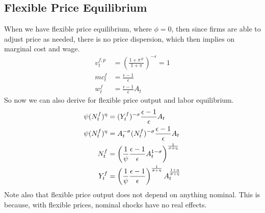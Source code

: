 \documentclass[twocolumn, fleqn]{article}
\begin{document}
	\subsection{Flexible Price Equilibrium}
	When we have flexible price equilibrium, where $\phi=0$, then since firms are able to adjust price as needed, there is no price dispersion, which then implies on marginal cost and wage.
	\begin{align*}
		 v_t^{f,p} &= \left( \frac{1 + \pi^{\#}}{1 + \pi} \right)^{-\epsilon} = 1\\
		 mc_t^f &= \frac{\epsilon-1}{\epsilon}\\
		 w_t^f &= \frac{\epsilon-1}{\epsilon	}A_t
	\end{align*}
	So now we can also derive for flexible price output and labor equilibrium.
	\begin{align}
    \psi (N_t^f)^{\eta} &= (Y_t^f)^{-\sigma} \frac{\epsilon-1}{\epsilon} A_t \notag\\
    \psi (N_t^f)^{\eta} &= A_t^{-\sigma} (N_t^f)^{-\sigma} \frac{\epsilon-1}{\epsilon} A_t \notag\\
    N_t^f &= \left( \frac{1}{\psi} \frac{\epsilon-1}{\epsilon} A_t^{1-\sigma} \right)^{\frac{1}{\sigma + \eta}} \notag\\
    Y_t^f &= \left( \frac{1}{\psi} \frac{\epsilon-1}{\epsilon} \right)^{\frac{1}{\sigma + \eta}} A_t^{\frac{1 + \eta}{\sigma + \eta}}
	\end{align}
	Note also that flexible price output does not depend on anything nominal. This is because, with flexible prices, nominal shocks have no real effects.
	
	
	
	
	
	
	
	
	
\end{document}
